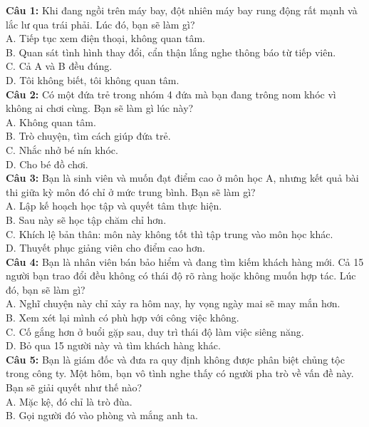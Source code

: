 \begin{multicols}{2}
\noindent
\textbf{Câu 1:} Khi đang ngồi trên máy bay, đột nhiên máy bay rung động rất mạnh và lắc lư qua trái phải. Lúc đó, bạn sẽ làm gì? \\
A. Tiếp tục xem điện thoại, không quan tâm. \\
B. Quan sát tình hình thay đổi, cẩn thận lắng nghe thông báo từ tiếp viên. \\
C. Cả A và B đều đúng. \\
D. Tôi không biết, tôi không quan tâm. \\
\textbf{Câu 2:} Có một đứa trẻ trong nhóm 4 đứa mà bạn đang trông nom khóc vì không ai chơi cùng. Bạn sẽ làm gì lúc này? \\
A. Không quan tâm. \\
B. Trò chuyện, tìm cách giúp đứa trẻ. \\
C. Nhắc nhở bé nín khóc. \\
D. Cho bé đồ chơi. \\
\textbf{Câu 3:} Bạn là sinh viên và muốn đạt điểm cao ở môn học A, nhưng kết quả bài thi giữa kỳ môn đó chỉ ở mức trung bình. Bạn sẽ làm gì? \\
A. Lập kế hoạch học tập và quyết tâm thực hiện. \\
B. Sau này sẽ học tập chăm chỉ hơn. \\
C. Khích lệ bản thân: môn này không tốt thì tập trung vào môn học khác. \\
D. Thuyết phục giảng viên cho điểm cao hơn. \\
\textbf{Câu 4:} Bạn là nhân viên bán bảo hiểm và đang tìm kiếm khách hàng mới. Cả 15 người bạn trao đổi đều không có thái độ rõ ràng hoặc không muốn hợp tác. Lúc đó, bạn sẽ làm gì? \\
A. Nghĩ chuyện này chỉ xảy ra hôm nay, hy vọng ngày mai sẽ may mắn hơn. \\
B. Xem xét lại mình có phù hợp với công việc không. \\
C. Cố gắng hơn ở buổi gặp sau, duy trì thái độ làm việc siêng năng. \\
D. Bỏ qua 15 người này và tìm khách hàng khác. \\
\textbf{Câu 5:} Bạn là giám đốc và đưa ra quy định không được phân biệt chủng tộc trong công ty. Một hôm, bạn vô tình nghe thấy có người pha trò về vấn đề này. Bạn sẽ giải quyết như thế nào? \\
A. Mặc kệ, đó chỉ là trò đùa. \\
B. Gọi người đó vào phòng và mắng anh ta. \\

\end{multicols}
